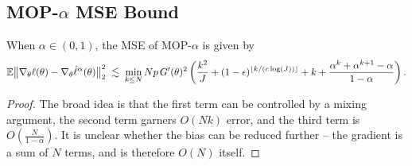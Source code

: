 \subsection{MOP-$\alpha$ MSE Bound}

\begin{thm}
    When $\alpha \in (0,1)$, the MSE of MOP-$\alpha$ is given by
    \begin{equation}
        \mathbb{E}\big\|\nabla_\theta\ell(\theta) - \nabla_\theta \hat\ell^\alpha(\theta)\big\|_2^2 \; \lesssim \; \min_{k \leq N} Np \, G'(\theta)^2\left(\frac{k^2}{J}+(1-\epsilon)^{\lfloor k/(c\log(J)) \rfloor}+k+\frac{\alpha^k  + \alpha^{k+1} - \alpha}{1-\alpha}\right).
    \end{equation}
\end{thm}

\begin{proof}
    
The broad idea is that the first term can be controlled by a mixing argument, the second term garners $O(Nk)$ error, and the third term is $O\left(\frac{N}{1-\alpha}\right)$. It is unclear whether the bias can be reduced further -- the gradient is a sum of $N$ terms, and is therefore $O(N)$ itself. 


\end{proof}
